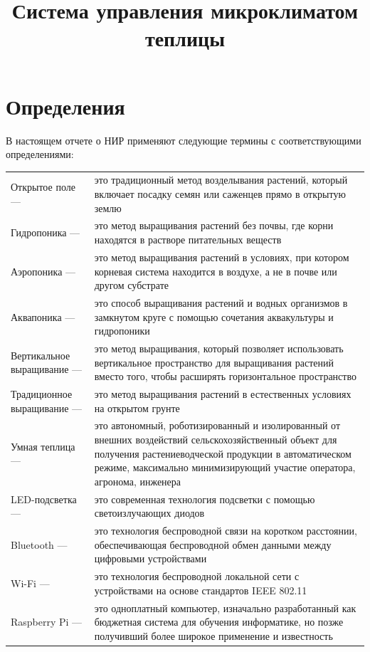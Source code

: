 \documentclass{altsu-bachelor}
\title{Система управления микроклиматом теплицы}
\institute{Институт цифровых технологий, электроники и физики}
\date{\the\year}
\begin{document}
\maketitle
\makeauthors
\makeabstract
\tableofcontents

\chapter*{Определения}

В настоящем отчете о НИР применяют следующие термины с соответствующими определениями:
\begin{longtable}{p{4cm} p{12cm}}
    Открытое поле --- & это традиционный метод возделывания растений, который включает посадку семян или саженцев прямо в открытую землю \\
    Гидропоника --- & это метод выращивания растений без почвы, где корни находятся в растворе питательных веществ \\
    Аэропоника --- & это метод выращивания растений в условиях, при котором корневая система находится в воздухе, а не в почве или другом субстрате \\
    Аквапоника --- & это способ выращивания растений и водных организмов в замкнутом круге с помощью сочетания аквакультуры и гидропоники \\
    Вертикальное выращивание --- & это метод выращивания, который позволяет использовать вертикальное пространство для выращивания растений вместо того, чтобы расширять горизонтальное пространство \\
    Традиционное выращивание --- & это метод выращивания растений в естественных условиях на открытом грунте \\
    Умная теплица --- & это автономный, роботизированный и изолированный от внешних воздействий сельскохозяйственный объект для получения растениеводческой продукции в автоматическом режиме, максимально минимизирующий участие оператора, агронома, инженера \\
    LED-подсветка --- & это современная технология подсветки с помощью светоизлучающих диодов \\
    Bluetooth --- & это технология беспроводной связи на коротком расстоянии, обеспечивающая беспроводной обмен данными между цифровыми устройствами \\
    Wi-Fi --- & это технология беспроводной локальной сети с устройствами на основе стандартов IEEE 802.11 \\
    Raspberry Pi --- & это одноплатный компьютер, изначально разработанный как бюджетная система для обучения информатике, но позже получивший более широкое применение и известность \\

\end{longtable}
\end{document}
